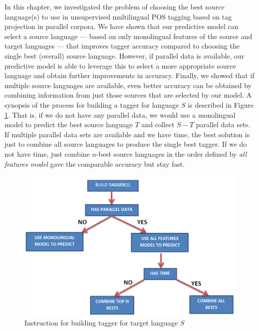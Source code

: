 In this chapter, we investigated the problem of choosing the best
source language(s) to use in unsupervised multilingual POS tagging based
on tag projection in parallel corpora. We have shown that our predictive model can select a source language --- based on only monolingual features of the source and
target languages --- that improves tagger accuracy compared to
choosing the single best (overall) source language. However, if
parallel data is available, our predictive model is able to leverage
this to select a more appropriate source language and obtain further
improvements in accuracy. Finally, we showed that if multiple source
languages are available, even better accuracy can be obtained by
combining information from just those sources that are selected by our model. A synopsis of the process for building a tagger for language $S$ is described in Figure \ref{fig:cheatSheet}. That is, if we do not have any parallel data, we would use a monolingual model to predict the best source language $T$ and collect $S-T$ parallel data sets. If multiple parallel data sets are available and we have time, the best solution is just to combine all source languages to produce the single best tagger. If we do not have time, just combine $n$-best source languages in the order defined by \textit{all features model} gave the comparable accuracy but stay fast. 

\begin{figure}
\centering
\includegraphics[scale=0.5]{Figures/cheatSheet}
\caption{Instruction for building tagger for target language $S$}
\label{fig:cheatSheet}
\end{figure}

